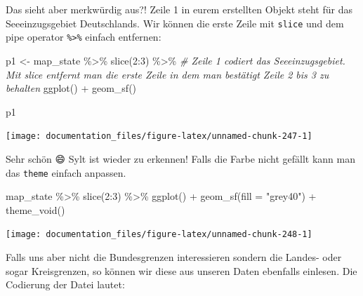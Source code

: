 \documentclass[
]{article}
\newenvironment{Shaded}{\begin{snugshade}}{\end{snugshade}}
\newcommand{\AttributeTok}[1]{\textcolor[rgb]{0.77,0.63,0.00}{#1}}
\newcommand{\CommentTok}[1]{\textcolor[rgb]{0.56,0.35,0.01}{\textit{#1}}}
\newcommand{\DecValTok}[1]{\textcolor[rgb]{0.00,0.00,0.81}{#1}}
\newcommand{\FunctionTok}[1]{\textcolor[rgb]{0.00,0.00,0.00}{#1}}
\newcommand{\NormalTok}[1]{#1}
\newcommand{\OtherTok}[1]{\textcolor[rgb]{0.56,0.35,0.01}{#1}}
\newcommand{\SpecialCharTok}[1]{\textcolor[rgb]{0.00,0.00,0.00}{#1}}
\newcommand{\StringTok}[1]{\textcolor[rgb]{0.31,0.60,0.02}{#1}}
\begin{document}
Das sieht aber merkwürdig aus?! Zeile 1 in eurem erstellten Objekt steht für das Seeeinzugsgebiet Deutschlands. Wir können die erste Zeile mit \texttt{slice} und dem pipe operator \texttt{\%\textgreater{}\%} einfach entfernen:

\begin{Shaded}
\begin{Highlighting}[]

\NormalTok{p1 }\OtherTok{\textless{}{-}}\NormalTok{ map\_state }\SpecialCharTok{\%\textgreater{}\%}
  \FunctionTok{slice}\NormalTok{(}\DecValTok{2}\SpecialCharTok{:}\DecValTok{3}\NormalTok{) }\SpecialCharTok{\%\textgreater{}\%}  \CommentTok{\# Zeile 1 codiert das Seeeinzugsgebiet. Mit \textasciigrave{}slice\textasciigrave{} entfernt man die erste Zeile in dem man bestätigt Zeile 2 bis 3 zu behalten}
  \FunctionTok{ggplot}\NormalTok{() }\SpecialCharTok{+}
  \FunctionTok{geom\_sf}\NormalTok{()}

\NormalTok{p1}
\end{Highlighting}
\end{Shaded}

\begin{center}\texttt{[image: documentation\_files/figure-latex/unnamed-chunk-247-1]} \end{center}

Sehr schön 😄 Sylt ist wieder zu erkennen! Falls die Farbe nicht gefällt kann man das \texttt{theme} einfach anpassen.

\begin{Shaded}
\begin{Highlighting}[]

\NormalTok{map\_state }\SpecialCharTok{\%\textgreater{}\%}
  \FunctionTok{slice}\NormalTok{(}\DecValTok{2}\SpecialCharTok{:}\DecValTok{3}\NormalTok{) }\SpecialCharTok{\%\textgreater{}\%}
  \FunctionTok{ggplot}\NormalTok{() }\SpecialCharTok{+}
  \FunctionTok{geom\_sf}\NormalTok{(}\AttributeTok{fill =} \StringTok{"grey40"}\NormalTok{) }\SpecialCharTok{+}
  \FunctionTok{theme\_void}\NormalTok{()}
\end{Highlighting}
\end{Shaded}

\begin{center}\texttt{[image: documentation\_files/figure-latex/unnamed-chunk-248-1]} \end{center}

Falls uns aber nicht die Bundesgrenzen interessieren sondern die Landes- oder sogar Kreisgrenzen, so können wir diese aus unseren Daten ebenfalls einlesen. Die Codierung der Datei lautet:
\end{document}
